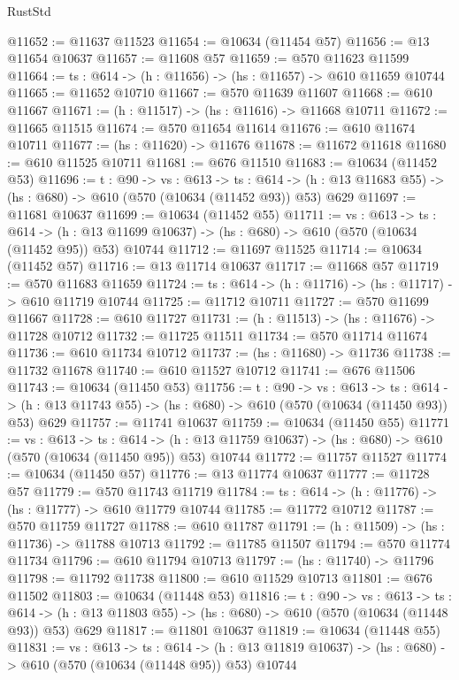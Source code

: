 \begin{lexlean}{RustStd}
\begin{coremodule}
@11652 := @11637 @11523
@11654 := @10634 (@11454 @57)
@11656 := @13 @11654 @10637
@11657 := @11608 @57
@11659 := @570 @11623 @11599
@11664 := {ts : @614} -> (h : @11656) -> (hs : @11657) -> @610 @11659 @10744
@11665 := @11652 @10710
@11667 := @570 @11639 @11607
@11668 := @610 @11667
@11671 := (h : @11517) -> (hs : @11616) -> @11668 @10711
@11672 := @11665 @11515
@11674 := @570 @11654 @11614
@11676 := @610 @11674 @10711
@11677 := (hs : @11620) -> @11676
@11678 := @11672 @11618
@11680 := @610 @11525 @10711
@11681 := @676 @11510
@11683 := @10634 (@11452 @53)
@11696 := {t : @90} ->
  {vs : @613} ->
  {ts : @614} -> (h : @13 @11683 @55) -> (hs : @680) -> @610 (@570 (@10634 (@11452 @93)) @53) @629
@11697 := @11681 @10637
@11699 := @10634 (@11452 @55)
@11711 := {vs : @613} ->
  {ts : @614} ->
  (h : @13 @11699 @10637) -> (hs : @680) -> @610 (@570 (@10634 (@11452 @95)) @53) @10744
@11712 := @11697 @11525
@11714 := @10634 (@11452 @57)
@11716 := @13 @11714 @10637
@11717 := @11668 @57
@11719 := @570 @11683 @11659
@11724 := {ts : @614} -> (h : @11716) -> (hs : @11717) -> @610 @11719 @10744
@11725 := @11712 @10711
@11727 := @570 @11699 @11667
@11728 := @610 @11727
@11731 := (h : @11513) -> (hs : @11676) -> @11728 @10712
@11732 := @11725 @11511
@11734 := @570 @11714 @11674
@11736 := @610 @11734 @10712
@11737 := (hs : @11680) -> @11736
@11738 := @11732 @11678
@11740 := @610 @11527 @10712
@11741 := @676 @11506
@11743 := @10634 (@11450 @53)
@11756 := {t : @90} ->
  {vs : @613} ->
  {ts : @614} -> (h : @13 @11743 @55) -> (hs : @680) -> @610 (@570 (@10634 (@11450 @93)) @53) @629
@11757 := @11741 @10637
@11759 := @10634 (@11450 @55)
@11771 := {vs : @613} ->
  {ts : @614} ->
  (h : @13 @11759 @10637) -> (hs : @680) -> @610 (@570 (@10634 (@11450 @95)) @53) @10744
@11772 := @11757 @11527
@11774 := @10634 (@11450 @57)
@11776 := @13 @11774 @10637
@11777 := @11728 @57
@11779 := @570 @11743 @11719
@11784 := {ts : @614} -> (h : @11776) -> (hs : @11777) -> @610 @11779 @10744
@11785 := @11772 @10712
@11787 := @570 @11759 @11727
@11788 := @610 @11787
@11791 := (h : @11509) -> (hs : @11736) -> @11788 @10713
@11792 := @11785 @11507
@11794 := @570 @11774 @11734
@11796 := @610 @11794 @10713
@11797 := (hs : @11740) -> @11796
@11798 := @11792 @11738
@11800 := @610 @11529 @10713
@11801 := @676 @11502
@11803 := @10634 (@11448 @53)
@11816 := {t : @90} ->
  {vs : @613} ->
  {ts : @614} -> (h : @13 @11803 @55) -> (hs : @680) -> @610 (@570 (@10634 (@11448 @93)) @53) @629
@11817 := @11801 @10637
@11819 := @10634 (@11448 @55)
@11831 := {vs : @613} ->
  {ts : @614} ->
  (h : @13 @11819 @10637) -> (hs : @680) -> @610 (@570 (@10634 (@11448 @95)) @53) @10744

\end{coremodule}
\end{lexlean}
